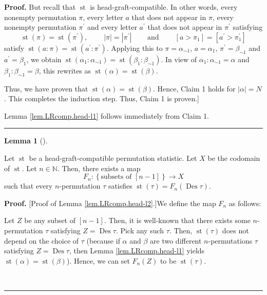 \documentclass[numbers=enddot,12pt,final,onecolumn,notitlepage]{scrartcl}%
\theoremstyle{definition}
\newtheorem{lem}[theo]{Lemma}
\newenvironment{lemma}[1][]
{\begin{lem}[#1]\begin{leftbar}}
{\end{leftbar}\end{lem}}
\newenvironment{proof}[1][Proof]{\noindent\textbf{#1.} }{\ \rule{0.5em}{0.5em}}
\newenvironment{verlong}{}{}
\begin{document}
\begin{verlong}
\begin{proof}
But recall that $\operatorname*{st}$ is head-graft-compatible. In other words,
every nonempty permutation $\pi$, every letter $a$ that does not appear in
$\pi$, every nonempty permutation $\pi^{\prime}$ and every letter $a^{\prime}$
that does not appear in $\pi^{\prime}$ satisfying%
\[
\operatorname*{st}\left(  \pi\right)  =\operatorname*{st}\left(  \pi^{\prime
}\right)  ,\ \ \ \ \ \ \ \ \ \ \left\vert \pi\right\vert =\left\vert
\pi^{\prime}\right\vert \ \ \ \ \ \ \ \ \ \ \text{and}%
\ \ \ \ \ \ \ \ \ \ \left[  a>\pi_{1}\right]  =\left[  a^{\prime}>\pi
_{1}^{\prime}\right]
\]
satisfy $\operatorname*{st}\left(  a:\pi\right)  =\operatorname*{st}\left(
a^{\prime}:\pi^{\prime}\right)  $. Applying this to $\pi=\alpha_{\sim1}$,
$a=\alpha_{1}$, $\pi^{\prime}=\beta_{\sim1}$ and $a^{\prime}=\beta_{1}$, we
obtain $\operatorname*{st}\left(  \alpha_{1}:\alpha_{\sim1}\right)
=\operatorname*{st}\left(  \beta_{1}:\beta_{\sim1}\right)  $. In view of
$\alpha_{1}:\alpha_{\sim1}=\alpha$ and $\beta_{1}:\beta_{\sim1}=\beta$, this
rewrites as $\operatorname*{st}\left(  \alpha\right)  =\operatorname*{st}%
\left(  \beta\right)  $.

Thus, we have proven that $\operatorname*{st}\left(  \alpha\right)
=\operatorname*{st}\left(  \beta\right)  $. Hence, Claim 1 holds for
$\left\vert \alpha\right\vert =N$. This completes the induction step. Thus,
Claim 1 is proven.]

Lemma \ref{lem.LRcomp.head-l1} follows immediately from Claim 1.
\end{proof}

\begin{lemma}
\label{lem.LRcomp.head-l2}Let $\operatorname*{st}$ be a head-graft-compatible
permutation statistic. Let $X$ be the codomain of $\operatorname*{st}$. Let
$n\in\mathbb{N}$. Then, there exists a map
\[
F_{n}:\left\{  \text{subsets of }\left[  n-1\right]  \right\}  \rightarrow X
\]
such that every $n$-permutation $\tau$ satisfies $\operatorname*{st}\left(
\tau\right)  =F_{n}\left(  \operatorname*{Des}\tau\right)  $.
\end{lemma}

\begin{proof}
[Proof of Lemma \ref{lem.LRcomp.head-l2}.]We define the map $F_{n}$ as follows:

Let $Z$ be any subset of $\left[  n-1\right]  $. Then, it is well-known that
there exists some $n$-permutation $\tau$ satisfying $Z=\operatorname*{Des}%
\tau$. Pick any such $\tau$. Then, $\operatorname*{st}\left(  \tau\right)  $
does not depend on the choice of $\tau$ (because if $\alpha$ and $\beta$ are
two different $n$-permutations $\tau$ satisfying $Z=\operatorname*{Des}\tau$,
then Lemma \ref{lem.LRcomp.head-l1} yields $\operatorname*{st}\left(
\alpha\right)  =\operatorname*{st}\left(  \beta\right)  $). Hence, we can set
$F_{n}\left(  Z\right)  $ to be $\operatorname*{st}\left(  \tau\right)  $.


\end{proof}
\end{verlong}
\end{document}
